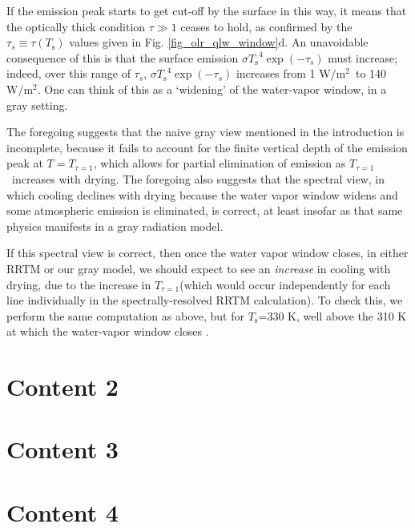 \documentclass[10pt]{article}
\newcommand{\Wmsq}{\ensuremath{\mathrm{W/m^2}}}
\newcommand{\taus}{\ensuremath{\tau_s}}
\newcommand{\Tone}{\ensuremath{T_{\tau=1}}}
\newcommand{\Ts}{\ensuremath{T_\mathrm{s}}}
\begin{document}
If the emission peak starts to get cut-off by the surface in this way, it means that the optically thick condition  $\tau \gg 1$ ceases to hold, as confirmed by the $\taus\equiv \tau(\Ts)$ values given in Fig. \ref{fig_olr_qlw_window}d. An unavoidable consequence of this is that the surface emission $\sigma\Ts^4 \exp(-\taus)$ must increase; indeed, over this range of \taus,   $\sigma\Ts^4 \exp(-\taus)$ increases from 1 \Wmsq\ to 140 \Wmsq. One can think of this as a `widening' of the water-vapor window, in a gray setting.

The foregoing suggests that the naive gray view mentioned in the introduction is incomplete, because it fails to account for the finite vertical depth of the emission peak at $T=\Tone$, which allows for partial elimination of emission as \Tone\ increases with drying. The foregoing also suggests that the spectral view, in which cooling declines with drying because the water vapor window widens and some atmospheric emission is eliminated, is correct, at least insofar as that same physics manifests in a gray radiation model. 

If this spectral view is correct, then once the water vapor window closes, in either RRTM or our gray model, we should expect to see an \emph{increase} in cooling with drying, due to the increase in \Tone (which would occur independently for each line individually in the spectrally-resolved RRTM calculation). To check this, we perform the same computation as above, but for \Ts=330 K, well above the 310 K at which the water-vapor window closes \citep{goldblatt2013}. 


	
\section{Content 2}


\section{Content 3 }


\section{Content 4 }
\end{document}

